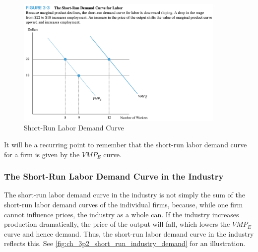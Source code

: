 \FloatBarrier

\begin{figure}[!htb]
    \centering
        \includegraphics[width=0.9\textwidth]{../input/ch_3p2_short_run_labor_demand.png}
    \caption{Short-Run Labor Demand Curve}
    \label{fig:ch_3p2_short_run_labor_demand}
\end{figure}

\FloatBarrier

\begin{overview}
    
    It will be a recurring point to remember that 
    the short-run labor demand curve for a firm
    is given by the $VMP_E$ curve.

\end{overview}

\subsubsection{The Short-Run Labor Demand Curve in the Industry}

The short-run labor demand curve in the industry 
is not simply the sum of the short-run labor demand curves
of the individual firms, because, while one firm 
cannot influence prices, the industry as a whole can.
If the industry increases production dramatically,
the price of the output will fall, which lowers
the $VMP_E$ curve and hence demand. 
Thus, the short-run labor demand curve in the industry
reflects this. See 
\autoref{fig:ch_3p2_short_run_industry_demand}
for an illustration.

\FloatBarrier

